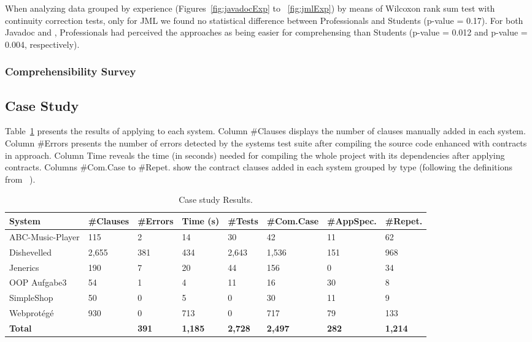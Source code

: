 When analyzing data grouped by experience (Figures~\ref{fig:javadocExp} to
~\ref{fig:jmlExp}) by means of Wilcoxon rank sum test with continuity correction
tests, only for JML we found no statistical difference between Professionals and
Students (p-value = 0.17). For both Javadoc and \contractjdoc{}, Professionals
had perceived the approaches as being easier for comprehensing than Students
(p-value = 0.012 and p-value = 0.004, respectively).


\subsubsection{Comprehensibility Survey}
\label{sec:surveyDiscussion}





\subsection{Case Study}

Table~\ref{tab:caseStudyResults} presents the results of applying \contractjdoc{} to each system.
Column \#Clauses displays the number of clauses manually added in each system.
Column \#Errors presents the number of errors detected by the systems test suite after compiling the source code enhanced with contracts in
\contractjdoc{} approach. Column Time reveals the time (in seconds) needed for compiling the whole
project with its dependencies after applying \contractjdoc{} contracts. Columns \#Com.Case to \#Repet.
show the contract clauses added in each system grouped by type (following the
definitions from ~\cite{typeContracts}).

\begin{table}[h]
\caption{Case study Results.}
\label{tab:caseStudyResults}
\centering
\begin{tabular}{l l l l l l l l}
\hline
 \bfseries System &
 \bfseries \#Clauses & 
 \bfseries \#Errors & 
 \bfseries Time (s) &
 \bfseries \#Tests &
 \bfseries \#Com.Case &
 \bfseries \#AppSpec. &
 \bfseries \#Repet. \\ \hline
ABC-Music-Player & 115 & 2 & 14 & 30 & 42 & 11 & 62 \\
Dishevelled & 2,655 & 381 & 434 & 2,643 & 1,536 & 151 & 968 \\
Jenerics & 190 & 7 & 20 & 44 & 156 & 0 & 34 \\
OOP Aufgabe3 & 54 & 1 & 4 & 11 & 16 & 30 & 8 \\
SimpleShop & 50 & 0 & 5 & 0 & 30 & 11 & 9 \\
Webprot\'{e}g\'{e} & 930 & 0 & 713 & 0 & 717 & 79 & 133 \\ \hline

 \bfseries Total & 
 \bfseries \totalClauses{} & 
 \bfseries 391 &
 \bfseries 1,185 &
 \bfseries 2,728 &
 \bfseries 2,497 &
 \bfseries 282 &
 \bfseries 1,214
\\
\bottomrule
\end{tabular}
\end{table}

